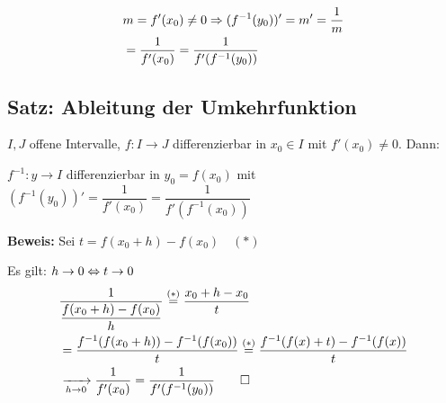 \documentclass[10pt, a4paper, fleqn]{article}
\begin{document}

\[\begin{aligned}
    &m = f'(x_0) \neq 0 \Rightarrow (f^{-1}(y_0))' = m' = \frac{1}{m} \\
    &= \frac{1}{f'(x_0)} = \frac{1}{f'(f^{-1} (y_0))}
\end{aligned}\]

\subsection{Satz: Ableitung der Umkehrfunktion}
$I, J$ offene Intervalle, $f: I \to J$ differenzierbar in $x_0 \in I$ mit
$f'(x_0) \neq 0$. Dann:

$f^{-1}: y \to I$ differenzierbar in $y_0 = f(x_0)$ mit $(f^{-1}(y_0))' = \dfrac{1}{f'(x_0)} = \dfrac{1}{f'(f^{-1}(x_0))}$

\textbf{Beweis: } Sei $t = f(x_0 + h) - f(x_0) \quad (*)$

Es gilt: $h \to 0 \Leftrightarrow t \to 0$
\[\begin{aligned}
    &\frac{1}{\dfrac{f(x_0 + h) - f(x_0)}{h}} \overset{(*)}{=} \frac{x_0 + h - x_0}{t} \\
    & = \frac{f^{-1}(f(x_0 + h)) - f^{-1}(f(x_0))}{t} \overset{(*)}{=} \frac{f^{-1}(f(x) + t) - f^{-1}(f(x))}{t} \\
    &\xrightarrow[h \to 0]{} \frac{1}{f'(x_0)} = \frac{1}{f'(f^{-1}(y_0))} \qed
\end{aligned}\]

\ifdefined\MAINDOC\else
\end{document}
